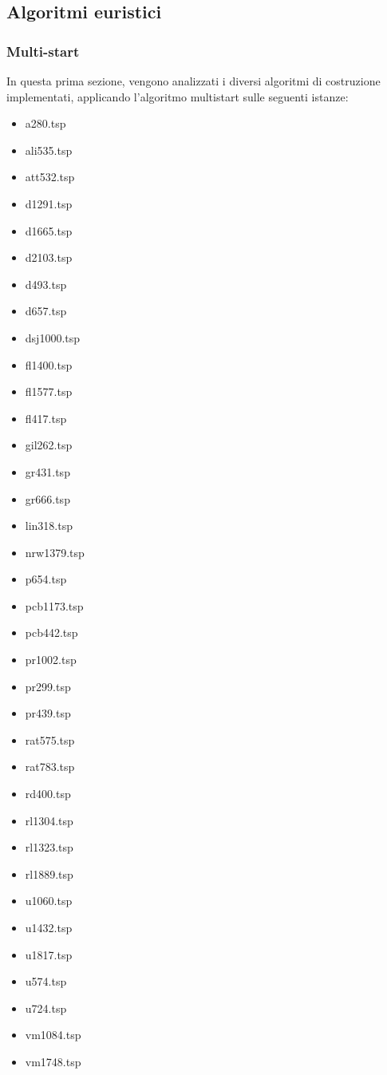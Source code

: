 \subsection{Algoritmi euristici}
\subsubsection{Multi-start}\label{construction_perf}
In questa prima sezione, vengono analizzati i diversi algoritmi di costruzione implementati, applicando l'algoritmo multistart sulle seguenti istanze:
\begin{center}
\begin{multicols}{4}
\begin{itemize}
\item{a280.tsp}
\item{ali535.tsp}
\item{att532.tsp}
\item{d1291.tsp}
\item{d1665.tsp}
\item{d2103.tsp}
\item{d493.tsp}
\item{d657.tsp}
\item{dsj1000.tsp}
\item{fl1400.tsp}
\item{fl1577.tsp}
\item{fl417.tsp}
\item{gil262.tsp}
\item{gr431.tsp}
\item{gr666.tsp}
\item{lin318.tsp}
\item{nrw1379.tsp}
\item{p654.tsp}
\item{pcb1173.tsp}
\item{pcb442.tsp}
\item{pr1002.tsp}
\item{pr299.tsp}
\item{pr439.tsp}
\item{rat575.tsp}
\item{rat783.tsp}
\item{rd400.tsp}
\item{rl1304.tsp}
\item{rl1323.tsp}
\item{rl1889.tsp}
\item{u1060.tsp}
\item{u1432.tsp}
\item{u1817.tsp}
\item{u574.tsp}
\item{u724.tsp}
\item{vm1084.tsp}
\item{vm1748.tsp}
\end{itemize}
\end{multicols}
\end{center}

